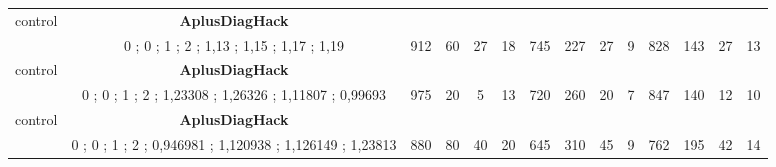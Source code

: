 \begin{table}[H]
{\begin{tabular}{|c|c|c|c|c|c|c|c|c|c|c|c|c|c|}
control & \cellcolor{blue!15}\textbf{AplusDiagHack}& {\color[HTML]{00009B} } & {\color[HTML]{9A0000} } & {\color[HTML]{009901} } &  & {\color[HTML]{00009B} } & {\color[HTML]{9A0000} } & {\color[HTML]{009901} } &  & {\color[HTML]{00009B} } & {\color[HTML]{9A0000} } & {\color[HTML]{009901} } &  \\ 
 & \cellcolor{ blue!15}0 ; 0 ; 1 ; 2 ; 1,13 ; 1,15 ; 1,17 ; 1,19 & \multirow{-2}{*}{{\color[HTML]{00009B} 912}} & \multirow{-2}{*}{{\color[HTML]{9A0000} 60}} & \multirow{-2}{*}{{\color[HTML]{009901} 27}} & \multirow{-2}{*}{18} & \multirow{-2}{*}{{\color[HTML]{00009B} 745}} & \multirow{-2}{*}{{\color[HTML]{9A0000} 227}} & \multirow{-2}{*}{{\color[HTML]{009901} 27}} & \multirow{-2}{*}{9} & \multirow{-2}{*}{{\color[HTML]{00009B} 828}} & \multirow{-2}{*}{{\color[HTML]{9A0000} 143}} & \multirow{-2}{*}{{\color[HTML]{009901} 27}} & \multirow{-2}{*}{13} \\ \hline

control & \cellcolor{blue!15}\textbf{AplusDiagHack}& {\color[HTML]{00009B} } & {\color[HTML]{9A0000} } & {\color[HTML]{009901} } &  & {\color[HTML]{00009B} } & {\color[HTML]{9A0000} } & {\color[HTML]{009901} } &  & {\color[HTML]{00009B} } & {\color[HTML]{9A0000} } & {\color[HTML]{009901} } &  \\ 
 & \cellcolor{ blue!15}0 ; 0 ; 1 ; 2 ; 1,23308 ; 1,26326 ; 1,11807 ; 0,99693 & \multirow{-2}{*}{{\color[HTML]{00009B} 975}} & \multirow{-2}{*}{{\color[HTML]{9A0000} 20}} & \multirow{-2}{*}{{\color[HTML]{009901} 5}} & \multirow{-2}{*}{13} & \multirow{-2}{*}{{\color[HTML]{00009B} 720}} & \multirow{-2}{*}{{\color[HTML]{9A0000} 260}} & \multirow{-2}{*}{{\color[HTML]{009901} 20}} & \multirow{-2}{*}{7} & \multirow{-2}{*}{{\color[HTML]{00009B} 847}} & \multirow{-2}{*}{{\color[HTML]{9A0000} 140}} & \multirow{-2}{*}{{\color[HTML]{009901} 12}} & \multirow{-2}{*}{10} \\ \hline

control & \cellcolor{blue!15}\textbf{AplusDiagHack}& {\color[HTML]{00009B} } & {\color[HTML]{9A0000} } & {\color[HTML]{009901} } &  & {\color[HTML]{00009B} } & {\color[HTML]{9A0000} } & {\color[HTML]{009901} } &  & {\color[HTML]{00009B} } & {\color[HTML]{9A0000} } & {\color[HTML]{009901} } &  \\ 
 & \cellcolor{ blue!15}0 ; 0 ; 1 ; 2 ; 0,946981 ; 1,120938 ; 1,126149 ; 1,23813 & \multirow{-2}{*}{{\color[HTML]{00009B} 880}} & \multirow{-2}{*}{{\color[HTML]{9A0000} 80}} & \multirow{-2}{*}{{\color[HTML]{009901} 40}} & \multirow{-2}{*}{20} & \multirow{-2}{*}{{\color[HTML]{00009B} 645}} & \multirow{-2}{*}{{\color[HTML]{9A0000} 310}} & \multirow{-2}{*}{{\color[HTML]{009901} 45}} & \multirow{-2}{*}{9} & \multirow{-2}{*}{{\color[HTML]{00009B} 762}} & \multirow{-2}{*}{{\color[HTML]{9A0000} 195}} & \multirow{-2}{*}{{\color[HTML]{009901} 42}} & \multirow{-2}{*}{14} \\ \hline


\end{tabular}}
\end{table}
